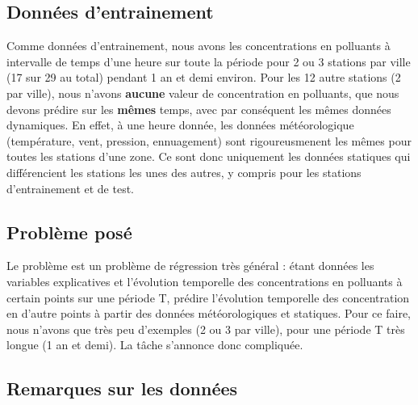 \subsection{Données d'entrainement}

Comme données d'entrainement, nous avons les concentrations en polluants à intervalle de temps d'une heure sur toute la période pour 2 ou 3 stations par ville (17 sur 29 au total) pendant 1 an et demi environ.
Pour les 12 autre stations (2 par ville), nous n'avons \textbf{aucune} valeur de concentration en polluants, que nous devons prédire sur les \textbf{mêmes} temps, avec par conséquent les mêmes données dynamiques. En effet, à une heure donnée, les données météorologique (température, vent, pression, ennuagement) sont rigoureusmenent les mêmes pour toutes les stations d'une zone. Ce sont donc uniquement les données statiques qui différencient les stations les unes des autres, y compris pour les stations d'entrainement et de test. %

\subsection{Problème posé}

Le problème est un problème de régression très général : étant données les variables explicatives et l'évolution temporelle des concentrations en polluants à certain points sur une période T, prédire l'évolution temporelle des concentration en d'autre points à partir des données météorologiques et statiques.
Pour ce faire, nous n'avons que très peu d'exemples (2 ou 3 par ville), pour une période T très longue (1 an et demi).
La tâche s'annonce donc compliquée.

\subsection{Remarques sur les données}

